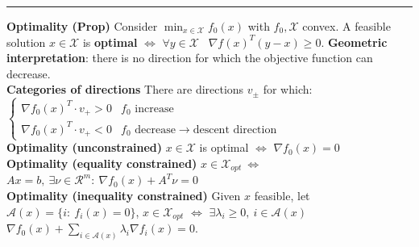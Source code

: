 \documentclass[a4paper]{article}
\begin{document}
\vspace{-0.5cm}
\hrule
\noindent
\textbf{Optimality (Prop)} Consider $\min_{x\in\mathcal{X}}{f_0(x)}$ with $f_0,\mathcal{X}$ convex. A feasible solution $x\in\mathcal{X}$ is \textbf{optimal} $\iff$ $\forall{y}\in\mathcal{X}$ \ $\nabla{f(x)}^T(y-x)\ge0$. \textbf{Geometric interpretation}: there is no direction for which the objective function can decrease.\\
\textbf{Categories of directions} There are directions $v_\pm$ for which: $\begin{cases}
    \nabla{f_0(x)}^T\cdot{v_+}>0&\text{$f_0$ increase}\\
    \nabla{f_0(x)}^T\cdot{v_+}<0&\text{$f_0$ decrease}\to\text{descent direction}
\end{cases}$\\
\textbf{Optimality (unconstrained)} $x\in\mathcal{X}$ is optimal $\iff$ $\nabla{f_0(x)}=0$\\
\textbf{Optimality (equality constrained)} $x\in\mathcal{X}_{opt} \ \iff$ $Ax=b, \ \exists \nu\in\mathcal{R}^m: \ 
\nabla{f_0(x)}+A^T\nu=0$\\
\textbf{Optimality (inequality constrained)} Given $x$ feasible, let $\mathcal{A}(x)=\{i: \ f_i(x)=0\}$, $x\in\mathcal{X}_{opt}$ $\iff$ $\exists\lambda_i\ge0, \ i\in\mathcal{A}(x)$ $\nabla{f_0(x)}+\sum_{i\in\mathcal{A}(x)}{\lambda_i\nabla{f_i(x)}}=0$.
\end{document}
